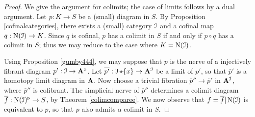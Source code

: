 \begin{proof}
We give the argument for colimits; the case of limits follows by a dual argument. Let $p: K \rightarrow S$ be a (small) diagram in $S$. 
By Proposition \ref{cofinalcategories}, there exists a (small) category
$\operatorname{\mathcal{I}}$ and a cofinal map $q: \operatorname{N}(\operatorname{\mathcal{I}}) \rightarrow K$. Since $q$ is cofinal, $p$ has a colimit in $S$ if and only if $p \circ q$ has a colimit in $S$; thus we may reduce to the case where $K = \operatorname{N}(\operatorname{\mathcal{I}})$. 

Using Proposition \ref{gumby444}, we may suppose that $p$ is the nerve of a injectively fibrant diagram $p': \operatorname{\mathcal{I}} \rightarrow {\mathbf A}^{\circ}$. Let $\overline{p'}: \operatorname{\mathcal{I}} \star \{x\} \rightarrow {\mathbf A}^{\operatorname{\mathcal{I}}}$ be a limit of $p'$, so that $\overline{p}'$ is a homotopy limit diagram in ${\mathbf A}$. Now choose a trivial fibration $\overline{p}'' \rightarrow \overline{p}'$ in ${\mathbf A}^{\operatorname{\mathcal{I}}}$, where $\overline{p}''$ is cofibrant. The simplicial nerve of $\overline{p}''$ determines a colimit diagram
$\overline{f}: \operatorname{N}(\operatorname{\mathcal{I}})^{\triangleright} \rightarrow S$, by Theorem \ref{colimcomparee}. We now
observe that $f = \overline{f} | \operatorname{N}(\operatorname{\mathcal{I}})$ is equivalent to $p$, so that $p$ also admits a colimit in $S$.
\end{proof}




